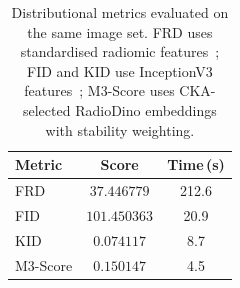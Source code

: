\begin{table}[htbp]
\centering
\caption{Distributional metrics evaluated on the same image set. FRD uses standardised radiomic features~\cite{konz2025frd}; FID and KID use InceptionV3 features~\cite{heusel2017gans,binkowski2018demystifying}; M3-Score uses CKA-selected RadioDino embeddings with stability weighting.}
\label{tab:frd_comparison}
\begin{tabular}{lcc}
\toprule
Metric & Score & Time\,(s) \\
\midrule
FRD & $37.446779$ & 212.6 \\
FID & $101.450363$ & 20.9 \\
KID & $0.074117$ & 8.7 \\
M3-Score & $0.150147$ & 4.5 \\
\bottomrule
\end{tabular}
\end{table}
